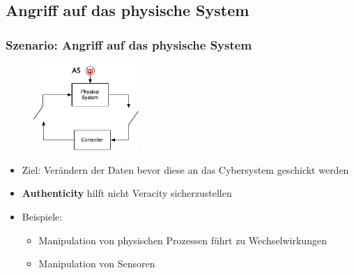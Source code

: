 \documentclass{sikslides}
\begin{document}
    \subsection{Angriff auf das physische System}
    \begin{frame}
        \frametitle{Szenario: Angriff auf das physische System}
        \begin{figure}
            \centering
            \includegraphics[width=4cm]{figure/physical}
        \end{figure}
        \begin{itemize}
            \item Ziel: Verändern der Daten bevor diese an das Cybersystem geschickt werden
            \item \textbf{Authenticity} hilft nicht Veracity sicherzustellen
            \pause
            \item Beispiele:
            \begin{itemize}
                \item Manipulation von physischen Prozessen führt zu Wechselwirkungen
                \item Manipulation von Sensoren
            \end{itemize}
        \end{itemize}
    \end{frame}

\end{document}
